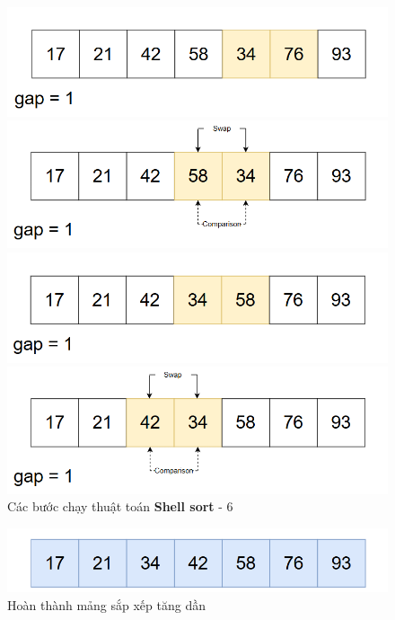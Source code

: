 \begin{figure}[H]
    \centering
    \includegraphics[width=1\linewidth]{img/shell_sort/21.png}
    \vspace{0.15cm}

    \includegraphics[width=1\linewidth]{img/shell_sort/22.png}
    \vspace{0.15cm}

    \includegraphics[width=1\linewidth]{img/shell_sort/23.png}
    \vspace{0.15cm}
    
    \includegraphics[width=1\linewidth]{img/shell_sort/24.png}
    \caption{Các bước chạy thuật toán \textbf{Shell sort} - 6}
\end{figure}

\begin{figure}[H]
    \centering
    \includegraphics[width=1\linewidth]{img/shell_sort/25.png}
    \caption{Hoàn thành mảng sắp xếp tăng dần}
\end{figure}

